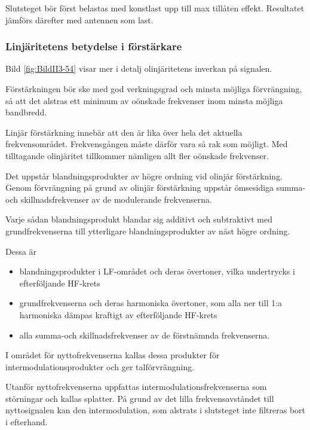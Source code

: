 Slutsteget bör först belastas med konstlast upp till max tillåten effekt.
Resultatet jämförs därefter med antennen som last.

\subsubsection{Linjäritetens betydelse i förstärkare}


Bild \ref{fig:BildII3-54} visar mer i detalj olinjäritetens inverkan på
signalen.

Förstärkningen bör ske med god verkningsgrad och minsta möjliga förvrängning,
så att det alstras ett minimum av oönskade frekvenser inom minsta möjliga
bandbredd.

Linjär förstärkning innebär att den är lika över hela det aktuella
frekvensområdet.
Frekvensgången måste därför vara så rak som möjligt.
Med tilltagande olinjäritet tillkommer nämligen allt fler oönskade frekvenser.

Det uppstår blandningsprodukter av högre ordning vid olinjär förstärkning.
Genom förvrängning på grund av olinjär förstärkning uppstår ömsesidiga summa-
och skillnadsfrekvenser av de modulerande frekvenserna.

Varje sådan blandningsprodukt blandar sig additivt och subtraktivt med
grundfrekvenserna till ytterligare blandningsprodukter av näst högre ordning.

Dessa är
\begin{itemize}
\item blandningsprodukter i LF-området och deras övertoner, vilka
  undertrycks i efterföljande HF-krets

\item grundfrekvenserna och deras harmoniska övertoner, som alla ner
  till 1:a harmoniska dämpas kraftigt av efterföljande HF-krets

\item alla summa-och skillnadsfrekvenser av de förstnämnda frekvenserna.
\end{itemize}

I området för nyttofrekvenserna kallas dessa produkter för
intermodulationsprodukter och ger talförvrängning.

Utanför nyttofrekvenserna uppfattas intermodulationsfrekvenserna som
störningar och kallas splatter.
På grund av det lilla frekvensavståndet till nyttosignalen kan den
intermodulation, som alstrats i slutsteget inte filtreras bort i efterhand.

